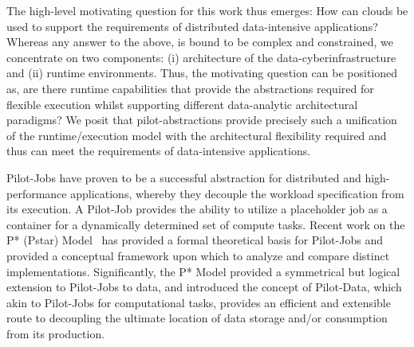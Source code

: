 \documentclass[times]{cpeauth}
\newcommand{\pilotjob}{Pilot-Job\xspace}
\newcommand{\pilotjobs}{Pilot-Jobs\xspace}
\begin{document}


The high-level motivating question for this work thus emerges: How can
clouds be used to support the requirements of distributed
data-intensive applications?  Whereas any answer to the above, is
bound to be complex and constrained, we concentrate on two components:
(i) architecture of the data-cyberinfrastructure and (ii) runtime
environments. Thus, the motivating question can be positioned as, are
there runtime capabilities that provide the abstractions required for
flexible execution whilst supporting different data-analytic
architectural paradigms?  We posit that pilot-abstractions provide
precisely such a unification of the runtime/execution model with the
architectural flexibility required and thus can meet the requirements
of data-intensive applications.


\pilotjobs have proven to be a successful abstraction for distributed
and high-performance applications, whereby they decouple the workload
specification from its execution. A \pilotjob provides the ability to
utilize a placeholder job as a container for a dynamically determined
set of compute tasks. Recent work on the P* (Pstar)
Model~\cite{pstar12} has provided a formal theoretical basis for
Pilot-Jobs and provided a conceptual framework upon which to analyze
and compare distinct implementations. Significantly, the P* Model
provided a symmetrical but logical extension to Pilot-Jobs to data,
and introduced the concept of Pilot-Data, which akin to Pilot-Jobs for
computational tasks, provides an efficient and extensible route to
decoupling the ultimate location of data storage and/or consumption
from its production.  
\end{document}
